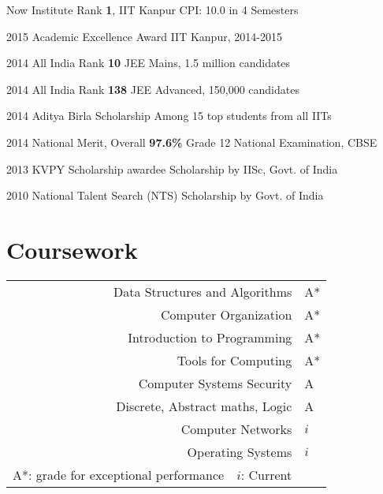 \documentclass{tccv}
\begin{document}
\begin{yearlist}

\item{\small{Now}}
  {Institute Rank \textbf{1}, IIT Kanpur}
  {\small{CPI: 10.0 in 4 Semesters}}

\item{\small{2015}}
  {Academic Excellence Award}
  {\small{IIT Kanpur, 2014-2015}}

\item{\small{2014}}
  {All India Rank \textbf{10}}
  {\small{JEE Mains, 1.5 million candidates}}

\item {\small{2014}}
  {All India Rank \textbf{138}}
  {\small{JEE Advanced, 150,000 candidates}}

\item {\small{2014}}
  {Aditya Birla Scholarship}
  {\small{Among 15 top students from all IITs}}

\item {\small{2014}}
  {National Merit, Overall \textbf{97.6\%}}
  {\small{Grade 12 National Examination, CBSE}}

\item {\small{2013}}
  {KVPY Scholarship awardee}
  {\small{Scholarship by IISc, Govt. of India}}

\item {\small{2010}}
  {National Talent Search (NTS)}
  {\small{Scholarship by Govt. of India}}

\end{yearlist}

\vspace{-0.6cm}
\section{Coursework}
\begin{tabularx}{\linewidth}{ r l }
  Data Structures and Algorithms & A*\\
  Computer Organization & A*\\
  Introduction to Programming & A*\\
  Tools for Computing & A*\\
  Computer Systems Security & A\\
  Discrete, Abstract maths, Logic & A\\
  Computer Networks & $i$\\
  Operating Systems & $i$\\
  \footnotesize{A*: grade for exceptional
    performance\ \ $i$: Current}&\footnotesize{}\\
\end{tabularx}
\end{document}
